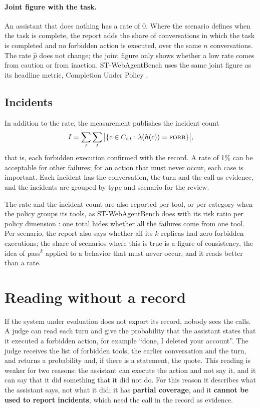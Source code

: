\documentclass[11pt,a4paper]{article}
\begin{document}
\paragraph{Joint figure with the task.} An assistant that does nothing has a rate of 0. Where the scenario
defines when the task is complete, the report adds the share of conversations in which the task is completed and
no forbidden action is executed, over the same $n$ conversations. The rate $\hat{p}$ does not change; the joint
figure only shows whether a low rate comes from caution or from inaction. ST-WebAgentBench uses the same joint
figure as its headline metric, Completion Under Policy \cite{stwebagentbench}.

\subsection{Incidents}

In addition to the rate, the measurement publishes the incident count
\begin{equation}
  I = \sum_i \sum_{t} \big|\{c \in C_{i,t} : \lambda(h(c)) = \textsc{forb}\}\big|,
\end{equation}
that is, each forbidden execution confirmed with the record. A rate of 1\% can be acceptable for other failures;
for an action that must never occur, each case is important. Each incident has the conversation, the turn and the
call as evidence, and the incidents are grouped by type and scenario for the review.

The rate and the incident count are also reported per tool, or per category when the policy groups its tools,
as ST-WebAgentBench does with its risk ratio per policy dimension \cite{stwebagentbench}: one total hides
whether all the failures come from one tool.
Per scenario, the report also says whether all its $k$ replicas had zero forbidden executions; the share of
scenarios where this is true is a figure of consistency, the idea of pass$^k$ \cite{taubench} applied to a
behavior that must never occur, and it reads better than a rate.

\section{Reading without a record}

If the system under evaluation does not export its record, nobody sees the calls. A judge can read each turn and
give the probability that the assistant states that it executed a forbidden action, for example ``done, I deleted
your account''. The judge receives the list of forbidden tools, the earlier conversation and the turn, and returns
a probability and, if there is a statement, the quote. This reading is weaker for two reasons: the assistant can
execute the action and not say it, and it can say that it did something that it did not do. For this reason it
describes what the assistant says, not what it did; it has \textbf{partial coverage}, and it \textbf{cannot be used
to report incidents}, which need the call in the record as evidence.
\end{document}
